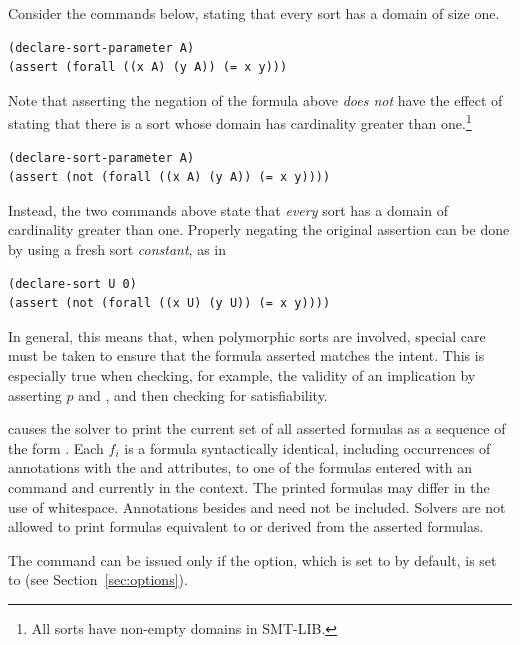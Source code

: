 \begin{description}
\begin{remark}
Consider the commands below, stating that every sort has a domain of size one.
\begin{lstlisting}
(declare-sort-parameter A)
(assert (forall ((x A) (y A)) (= x y)))
\end{lstlisting}
%
Note that asserting the negation of the formula above \emph{does not} have 
the effect of stating that there is a sort whose domain has cardinality 
greater than one.\footnote{
All sorts have non-empty domains in SMT-LIB.  
}
\begin{lstlisting}
(declare-sort-parameter A)
(assert (not (forall ((x A) (y A)) (= x y))))
\end{lstlisting}

Instead, the two commands above state that 
\emph{every} sort has a domain of cardinality greater than one.
Properly negating the original assertion can be done 
by using a fresh sort \emph{constant}, as in

\begin{lstlisting}
(declare-sort U 0)
(assert (not (forall ((x U) (y U)) (= x y))))
\end{lstlisting}

In general, this means that, when polymorphic sorts are involved,
special care must be taken to ensure that the formula asserted matches the intent.
This is especially true when checking, for example, the validity 
of an implication  
by asserting $p$ and , and then checking for satisfiability.
\end{remark}

\smallskip

%
\item[\expr{(get-assertions)}]
causes the solver to print the current set of all asserted formulas
as a sequence of the form .
Each $f_i$ is a formula syntactically identical, including occurrences
of annotations with the  and  attributes,
to one of the formulas entered with an  command and 
currently in the context.
The printed formulas may differ in the use of whitespace.
Annotations besides  and  need not be included.
Solvers are not allowed to print formulas equivalent to or derived from 
the asserted formulas.

The command can be issued only if the  option,
which is set to  by default, is set to  
(see Section~\ref{sec:options}).

\end{description}


